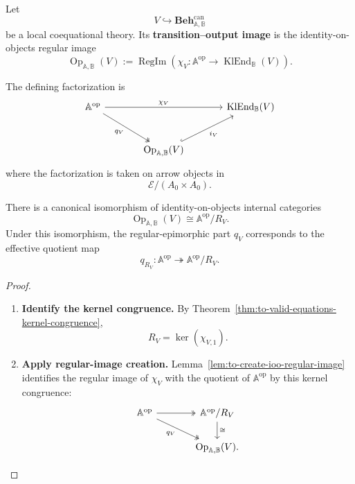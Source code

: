 \begin{definition}
\label{def:to-transition-output-image}
    Let
    \[
        V\hookrightarrow
        \mathbf{Beh}^{\mathrm{can}}_{\mathbb A,\mathbb B}
    \]
    be a local coequational theory. Its \textbf{transition--output image} is
    the identity-on-objects regular image
    \[
        \operatorname{Op}_{\mathbb A,\mathbb B}(V)
        :=
        \operatorname{RegIm}
        \left(
            \chi_V:
            \mathbb A^{\mathrm{op}}
            \to
            \operatorname{KlEnd}_{\mathbb B}(V)
        \right).
    \]
\end{definition}

The defining factorization is
\[
\begin{tikzcd}[column sep=large, row sep=large]
    \mathbb A^{\mathrm{op}}
        \arrow[rr, "\chi_V"]
        \arrow[dr, two heads, "q_V"']
    &&
    \operatorname{KlEnd}_{\mathbb B}(V)
    \\
    &
    \operatorname{Op}_{\mathbb A,\mathbb B}(V)
        \arrow[ur, hook, "i_V"']
    &
\end{tikzcd}
\]
where the factorization is taken on arrow objects in
\[
    \mathcal E/(A_0\times A_0).
\]

\begin{theorem}
\label{thm:to-transition-output-quotient}
    There is a canonical isomorphism of identity-on-objects internal categories
    \[
        \operatorname{Op}_{\mathbb A,\mathbb B}(V)
        \cong
        \mathbb A^{\mathrm{op}}/R_V.
    \]
    Under this isomorphism, the regular-epimorphic part \(q_V\) corresponds to
    the effective quotient map
    \[
        q_{R_V}:
        \mathbb A^{\mathrm{op}}
        \twoheadrightarrow
        \mathbb A^{\mathrm{op}}/R_V.
    \]
\end{theorem}

\begin{proof}
    \leavevmode
    \begin{enumerate}
        \item \textbf{Identify the kernel congruence.}
        By Theorem~\ref{thm:to-valid-equations-kernel-congruence},
        \[
            R_V=\ker(\chi_{V,1}).
        \]

        \item \textbf{Apply regular-image creation.}
        Lemma~\ref{lem:to-create-ioo-regular-image} identifies the regular
        image of \(\chi_V\) with the quotient of
        \(\mathbb A^{\mathrm{op}}\) by this kernel congruence:
        \[
        \begin{tikzcd}[column sep=large]
            \mathbb A^{\mathrm{op}}
                \arrow[r, two heads]
                \arrow[dr, two heads, "q_V"']
            &
            \mathbb A^{\mathrm{op}}/R_V
                \arrow[d, "\cong"]
            \\
            &
            \operatorname{Op}_{\mathbb A,\mathbb B}(V).
        \end{tikzcd}
        \]
    \end{enumerate}
\end{proof}

